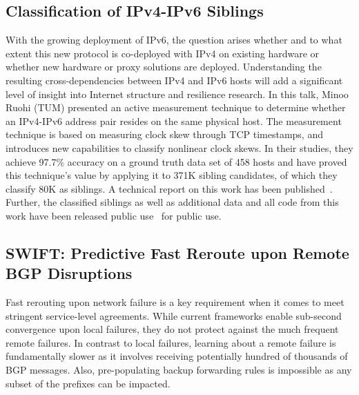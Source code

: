 \subsection{Classification of IPv4-IPv6 Siblings}

With the growing deployment of IPv6, the question arises whether and to what
extent this new protocol is co-deployed with IPv4 on existing hardware or
whether new hardware or proxy solutions are deployed. Understanding the
resulting cross-dependencies between IPv4 and IPv6 hosts will add a
significant level of insight into Internet structure and resilience research.
In this talk, Minoo Ruohi (TUM) presented an active measurement technique to
determine whether an IPv4-IPv6 address pair resides on the same physical host.
The measurement technique is based on measuring clock skew through TCP
timestamps, and introduces new capabilities to classify nonlinear clock skews.
In their studies, they achieve 97.7\% accuracy on a ground truth data set of
458 hosts and have proved this technique's value by applying it to 371K
sibling candidates, of which they classify 80K as siblings. A technical report
on this work has been published~\cite{qscheitle:arxiv:2016}. Further, the
classified siblings as well as additional data and all code from this work
have been released public use~\cite{qscheitle:arxiv:2016} for public use.


\subsection{SWIFT\@: Predictive Fast Reroute upon Remote BGP Disruptions}

Fast rerouting upon network failure is a key requirement when it comes to meet
stringent service-level agreements. While current frameworks enable sub-second
convergence upon local failures, they do not protect against the much frequent
remote failures. In contrast to local failures, learning about a remote
failure is fundamentally slower as it involves receiving potentially hundred
of thousands of BGP messages. Also, pre-populating backup forwarding rules is
impossible as any subset of the prefixes can be impacted.

